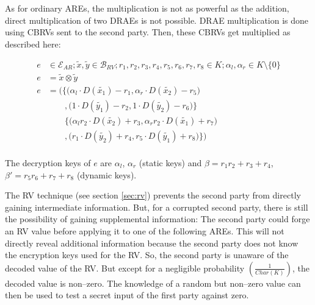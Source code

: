 As for ordinary AREs, the multiplication is not as powerful as the addition,
direct multiplication of two DRAEs is not possible. DRAE multiplication is
done using CBRVs sent to the second party. Then, these CBRVs get multiplied as
described here:

\begin{align*}
  e & \in \mathcal{E}_{AR}; \widetilde{x}, \widetilde{y} \in \mathcal{B}_{RV};
  r_1, r_2, r_3, r_4, r_5, r_6, r_7, r_8 \in K;
  \alpha_l, \alpha_r \in K \setminus \{0\} \\
  e & = \widetilde{x} \otimes \widetilde{y} \\
  e & = \Bigg(\Big\{\big( \alpha_l \cdot D(\widetilde{x_1}) - r_1,
                          \alpha_r \cdot D(\widetilde{x_2}) -r_5 \big) \\
    &\qquad ,     \big(   1        \cdot D(\widetilde{y_1}) - r_2,
                          1        \cdot D(\widetilde{y_2}) - r_6 \big) \Big\}\\
    &\qquad   \Big\{\big( \alpha_lr_2 \cdot D(\widetilde{x_2}) + r_3,
                          \alpha_rr_2 \cdot D(\widetilde{x_1}) + r_7 \big) \\
    &\qquad ,       \big ( r_1        \cdot D(\widetilde{y_2}) + r_4,
                           r_5        \cdot D(\widetilde{y_1}) + r_8 \big)
              \Big\}\Bigg) \\
\end{align*}

The decryption keys of $e$ are $\alpha_l$, $\alpha_r$ (static keys) and
$\beta = r_1r_2 + r_3 + r_4$, $\beta' = r_5r_6 + r_7 + r_8$ (dynamic keys).

\label{sec:cbrv}

The RV technique (see section \ref{sec:rv}) prevents the
second party from directly gaining intermediate information. But, for a
corrupted second party, there is still the possibility of gaining supplemental
information: The second party could forge an RV value before applying it to one
of the following AREs. This will not directly reveal additional information
because the second party does not know the encryption keys used for the RV. So,
the second party is unaware of the decoded value of the RV. But except for a
negligible probability $\left(\frac{1}{Char(K)}\right)$, the decoded value is
non--zero.  The knowledge of a random but non--zero value can then be used to
test a secret input of the first party against zero. 

